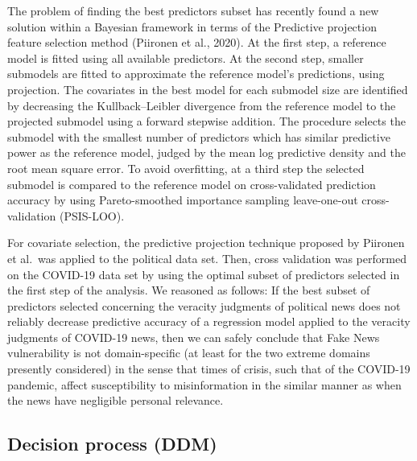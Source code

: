 \documentclass[
  man,floatsintext]{apa6}
\begin{document}
The problem of finding the best predictors subset has recently found a new solution within a Bayesian framework in terms of the Predictive projection feature selection method (Piironen et al., 2020). At the first step, a reference model is fitted using all available predictors. At the second step, smaller submodels are fitted to approximate the reference model's predictions, using projection. The covariates in the best model for each submodel size are identified by decreasing the Kullback--Leibler divergence from the reference model to the projected submodel using a forward stepwise addition. The procedure selects the submodel with the smallest number of predictors which has similar predictive power as the reference model, judged by the mean log predictive density and the root mean square error. To avoid overfitting, at a third step the selected submodel is compared to the reference model on cross-validated prediction accuracy by using Pareto-smoothed importance sampling leave-one-out cross-validation (PSIS-LOO).

For covariate selection, the predictive projection technique proposed by Piironen et al.~was applied to the political data set. Then, cross validation was performed on the COVID-19 data set by using the optimal subset of predictors selected in the first step of the analysis. We reasoned as follows: If the best subset of predictors selected concerning the veracity judgments of political news does not reliably decrease predictive accuracy of a regression model applied to the veracity judgments of COVID-19 news, then we can safely conclude that Fake News vulnerability is not domain-specific (at least for the two extreme domains presently considered) in the sense that times of crisis, such that of the COVID-19 pandemic, affect susceptibility to misinformation in the similar manner as when the news have negligible personal relevance.

\hypertarget{decision-process-ddm}{%
\subsection{Decision process (DDM)}\label{decision-process-ddm}}
\end{document}
